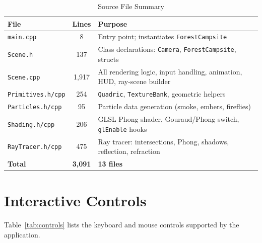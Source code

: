 \documentclass[12pt,a4paper]{report}
\newcommand{\tabfmt}{\footnotesize\singlespacing\renewcommand{\arraystretch}{1.1}}
\begin{document}
\begin{table}[!htbp]
\centering\tabfmt
\caption{Source File Summary}
\label{tab:files}
\begin{tabularx}{\textwidth}{|l|c|Y|}
\hline
\textbf{File} & \textbf{Lines} & \textbf{Purpose} \\
\hline
\texttt{main.cpp} & 8 & Entry point; instantiates \texttt{ForestCampsite} \\
\hline
\texttt{Scene.h} & 137 & Class declarations: \texttt{Camera}, \texttt{ForestCampsite}, structs \\
\hline
\texttt{Scene.cpp} & 1,917 & All rendering logic, input handling, animation, HUD, ray-scene builder \\
\hline
\texttt{Primitives.h/cpp} & 254 & \texttt{Quadric}, \texttt{TextureBank}, geometric helpers \\
\hline
\texttt{Particles.h/cpp} & 95 & Particle data generation (smoke, embers, fireflies) \\
\hline
\texttt{Shading.h/cpp} & 206 & GLSL Phong shader, Gouraud/Phong switch, \texttt{glEnable} hooks \\
\hline
\texttt{RayTracer.h/cpp} & 475 & Ray tracer: intersections, Phong, shadows, reflection, refraction \\
\hline
\textbf{Total} & \textbf{3,091} & \textbf{13 files} \\
\hline
\end{tabularx}
\end{table}

\section{Interactive Controls}

Table~\ref{tab:controls} lists the keyboard and mouse controls supported by the application.
\end{document}
